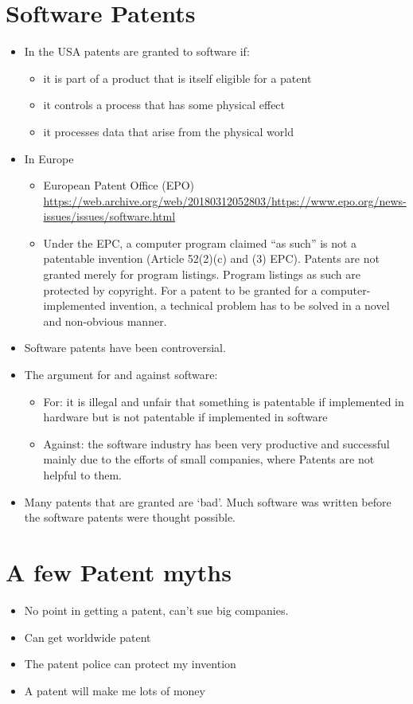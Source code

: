 \documentclass{article}
\begin{document}
\section{Software Patents}
\begin{itemize}
\item In the USA patents are granted to software if: 
\begin{itemize}
\item it is part of a product that is itself eligible for a patent
\item it controls a process that has some physical effect
\item it processes data that arise from the physical world
\end{itemize}
\item In Europe
\begin{itemize}
\item European Patent Office (EPO) \url{https://web.archive.org/web/20180312052803/https://www.epo.org/news-issues/issues/software.html}
\item Under the EPC, a computer program claimed ``as such'' is not a patentable invention (Article 52(2)(c) and (3) EPC). Patents are not granted merely for program listings. Program listings as such are protected by copyright. For a patent to be granted for a computer-implemented invention, a technical problem has to be solved in a novel and non-obvious manner. 
\end{itemize}

\item Software patents have been controversial.
\item The argument for and against software:
\begin{itemize}
\item For: it is illegal and unfair that something is patentable if implemented in hardware but is not patentable if implemented in software
\item Against: the software industry has been very productive and successful mainly due to the efforts of small companies, where Patents are not helpful to them. 
\end{itemize}
\item Many patents that are granted are `bad'. Much software was written before the software patents were thought possible.
\end{itemize}




\section{A few Patent myths}
\begin{itemize}
\item No point in getting a patent, can't sue big companies.
\item Can get worldwide patent
\item The patent police can protect my invention
\item A patent will make me lots of money
\end{itemize}
\end{document}

